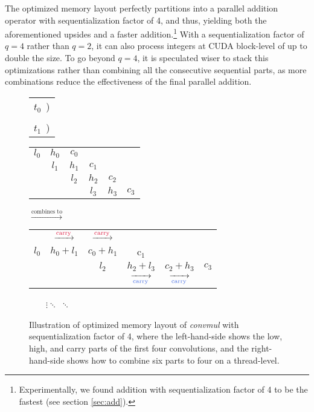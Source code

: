 The optimized memory layout perfectly partitions into a parallel addition
operator with sequentialization factor of 4, and thus, yielding both the
aforementioned upsides and a faster addition.\footnote{Experimentally, we found
  addition with sequentialization factor of 4 to be the fastest (see section
  \ref{sec:add}).}  With a sequentialization factor of $q=4$ rather than $q=2$,
it can also process integers at CUDA block-level of up to double the size. To go
beyond $q=4$, it is speculated wiser to stack this optimizations rather than
combining all the consecutive sequential parts, as more combinations reduce the
effectiveness of the final parallel addition.



\begin{figure}
  \begin{center}
  \small
  \begin{tabular}{C{0.5cm}}
  \Large{\color{Crimson} $t_0$}~)\\\\
    \Large{\color{RoyalBlue} $t_1$}~)
\end{tabular}
  \begin{tabular}{cccccc}
    \color{Crimson}$l_0$ & \color{Crimson}$h_0$ & \color{Crimson}$c_0$ & & & \\
    & \color{Crimson}$l_1$ & \color{Crimson}$h_1$ & \color{Crimson}$c_1$ & & \\
    & & \color{RoyalBlue}$l_2$ & \color{RoyalBlue}$h_2$ & \color{RoyalBlue}$c_2$ & \\
    & & & \color{RoyalBlue}$l_3$ & \color{RoyalBlue}$h_3$ & \color{RoyalBlue}$c_3$
  \end{tabular}
$\xrightarrow{\text{combines to}}$
\begin{tabular}{cccccc}
     & $\xrightarrow{\scriptsize \text{\color{Crimson}carry}}$ & $\xrightarrow{\scriptsize \text{\color{Crimson}carry}}$ &  &  &  \\
    \color{Crimson}$l_0$ & \color{Crimson}$h_0 + l_1$ & \color{Crimson}$c_0 + h_1$ & \color{Crimson}c$_1$ & & \\
    & & \color{RoyalBlue}$l_2$ & \color{RoyalBlue}$h_2+l_3$ & \color{RoyalBlue}$c_2+h_3$ & \color{RoyalBlue} $c_3$\\
  & & & $\xrightarrow[\scriptsize \text{\color{RoyalBlue}carry}]{}$ & $\xrightarrow[\scriptsize \text{\color{RoyalBlue}carry}]{}$ & \\
\end{tabular}
\end{center}
~~~~$\vdots$\qquad\qquad\qquad\qquad\qquad $\ddots$ \qquad\qquad\qquad\qquad\qquad\qquad\qquad\qquad\qquad\qquad\qquad\qquad  $\ddots$
\caption{\footnotesize Illustration of optimized memory layout of
  \textit{convmul} with sequentialization factor of 4, where the left-hand-side
  shows the low, high, and carry parts of the first four convolutions, and the
  right-hand-side shows how to combine six parts to four on a thread-level.}
  \label{fig:muloptmem}
\end{figure}

